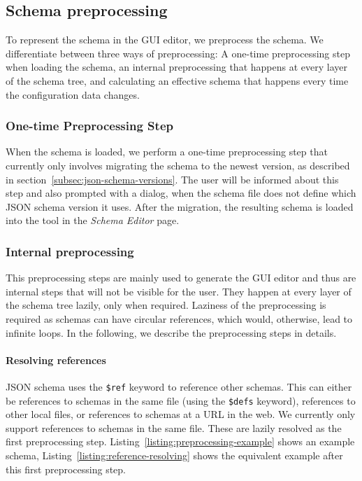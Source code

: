\subsection{Schema preprocessing}\label{subsec:schema-preprocessing}

To represent the schema in the GUI editor, we preprocess the schema.
We differentiate between three ways of preprocessing:
A one-time preprocessing step when loading the schema, an internal preprocessing that happens at every layer of the schema tree,
and calculating an effective schema that happens every time the configuration data changes.

\subsubsection{One-time Preprocessing Step}
When the schema is loaded, we perform a one-time preprocessing step that currently only involves migrating the schema to the newest version,
as described in section~\ref{subsec:json-schema-versions}.
The user will be informed about this step and also prompted with a dialog, when the schema file does not define which JSON schema version it uses.
After the migration, the resulting schema is loaded into the tool in the \textit{Schema Editor} page.


\subsubsection{Internal preprocessing}
This preprocessing steps are mainly used to generate the GUI editor and thus are internal steps that will not be visible for the user.
They happen at every layer of the schema tree lazily, only when required.
Laziness of the preprocessing is required as schemas can have circular references, which would, otherwise, lead to infinite loops.
In the following, we describe the preprocessing steps in details.

\paragraph{Resolving references}
JSON schema uses the \texttt{\$ref} keyword to reference other schemas.
This can either be references to schemas in the same file (using the \texttt{\$defs} keyword), references to other local files,
or references to schemas at a URL in the web.
We currently only support references to schemas in the same file.
These are lazily resolved as the first preprocessing step.
Listing~\ref{listing:preprocessing-example} shows an example schema, Listing~\ref{listing:reference-resolving} shows the equivalent example after
this first preprocessing step.

